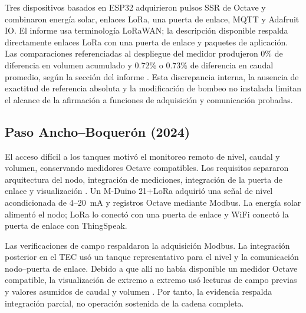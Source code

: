\documentclass[conference]{IEEEtran}
\begin{document}
Tres dispositivos basados en ESP32 adquirieron pulsos SSR de Octave y combinaron energía solar, enlaces LoRa, una puerta de enlace, MQTT y Adafruit IO. El informe usa terminología LoRaWAN; la descripción disponible respalda directamente enlaces LoRa con una puerta de enlace y paquetes de aplicación. Las comparaciones referenciadas al despliegue del medidor produjeron 0\% de diferencia en volumen acumulado y 0.72\% o 0.73\% de diferencia en caudal promedio, según la sección del informe \cite[Sec.~5.2.2 y conclusiones]{solorzano2021sistema}. Esta discrepancia interna, la ausencia de exactitud de referencia absoluta y la modificación de bombeo no instalada limitan el alcance de la afirmación a funciones de adquisición y comunicación probadas.

\subsection{Paso Ancho--Boquerón (2024)}

El acceso difícil a los tanques motivó el monitoreo remoto de nivel, caudal y volumen, conservando medidores Octave compatibles. Los requisitos separaron arquitectura del nodo, integración de mediciones, integración de la puerta de enlace y visualización \cite[Secs.~1.3--2.1]{oviedo2024desarrollo}. Un M-Duino 21+LoRa adquirió una señal de nivel acondicionada de 4--20~mA y registros Octave mediante Modbus. La energía solar alimentó el nodo; LoRa lo conectó con una puerta de enlace y WiFi conectó la puerta de enlace con ThingSpeak.

Las verificaciones de campo respaldaron la adquisición Modbus. La integración posterior en el TEC usó un tanque representativo para el nivel y la comunicación nodo--puerta de enlace. Debido a que allí no había disponible un medidor Octave compatible, la visualización de extremo a extremo usó lecturas de campo previas y valores asumidos de caudal y volumen \cite[Sec.~6.2 y anexos~9.2--9.3]{oviedo2024desarrollo}. Por tanto, la evidencia respalda integración parcial, no operación sostenida de la cadena completa.
\end{document}
